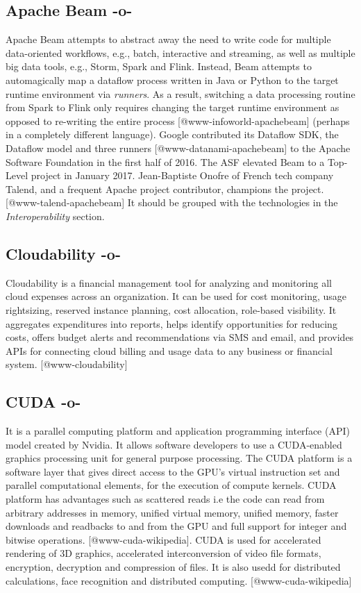 \subsection{Apache Beam -o-}

Apache Beam attempts to abstract away the need to write code for
multiple data-oriented workflows, e.g., batch, interactive and
streaming, as well as multiple big data tools, e.g., Storm, Spark and
Flink.  Instead, Beam attempts to automagically map a dataflow process
written in Java or Python to the target runtime environment via
\textit{runners}.  As a result, switching a data processing routine from
Spark to Flink only requires changing the target runtime environment
as opposed to re-writing the entire
process [@www-infoworld-apachebeam] (perhaps in a completely
different language).  Google contributed its Dataflow SDK, the
Dataflow model and three runners [@www-datanami-apachebeam] to the
Apache Software Foundation in the first half of 2016.  The ASF
elevated Beam to a Top-Level project in January 2017.  Jean-Baptiste
Onofre of French tech company Talend, and a frequent Apache project
contributor, champions the project. [@www-talend-apachebeam] It
should be grouped with the technologies in the \textit{Interoperability}
section.

\subsection{Cloudability -o-}

Cloudability is a financial management tool for analyzing and
monitoring all cloud expenses across an organization. It can be used
for cost monitoring, usage rightsizing, reserved instance planning,
cost allocation, role-based visibility. It aggregates expenditures
into reports, helps identify opportunities for reducing costs, offers
budget alerts and recommendations via SMS and email, and provides APIs
for connecting cloud billing and usage data to any business or
financial system. [@www-cloudability]



\subsection{CUDA -o-}

It is a parallel computing platform and application programming
interface (API) model created by Nvidia. It allows software developers
to use a CUDA-enabled graphics processing unit for general purpose
processing. The CUDA platform is a software layer that gives direct
access to the GPU's virtual instruction set and parallel computational
elements, for the execution of compute kernels.  CUDA platform has
advantages such as scattered reads i.e the code can read from
arbitrary addresses in memory, unified virtual memory, unified memory,
faster downloads and readbacks to and from the GPU and full support
for integer and bitwise operations. [@www-cuda-wikipedia].  CUDA
is used for accelerated rendering of 3D graphics, accelerated
interconversion of video file formats, encryption, decryption and
compression of files.  It is also usedd for distributed calculations,
face recognition and distributed computing. [@www-cuda-wikipedia]
    


